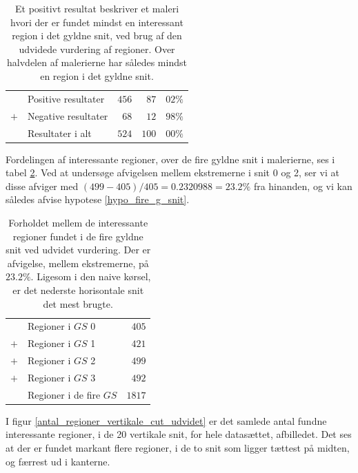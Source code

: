 {\begin{table}[H]
    \centering
    \begin{tabular}{r@{\ \ }p{12em}r|r@{.}l}
            & Positive resultater   & $456$ &  $87$ & $02\%$ \\
        $+$ & Negative resultater   &  $68$ &  $12$ & $98\%$ \\\hline
            & Resultater i alt      & $524$ & $100$ & $00\%$
    \end{tabular}
    \caption[]{Et positivt resultat beskriver et maleri hvori der er
    fundet mindst en interessant region i det gyldne snit, ved brug af
    den udvidede vurdering af regioner. Over halvdelen af malerierne har
    således mindst en region i det gyldne snit.}
    \label{ud_tabel_fordeling}
\end{table}

Fordelingen af interessante regioner, over de fire gyldne snit i
malerierne, ses i tabel \ref{ud_tabel_fire_snit}. Ved at undersøge
afvigelsen mellem ekstremerne i snit 0 og 2, ser vi at disse afviger med
$(499 - 405)/405 = 0.2320988 = 23.2 \%$ fra hinanden, og vi kan således
afvise hypotese \ref{hypo_fire_g_snit}.

\begin{table}[H]
    \centering
    \begin{tabular}{r@{\ \ }p{12em}r}
            & Regioner i $GS$ 0         &  $405$ \\
        $+$ & Regioner i $GS$ 1         &  $421$ \\
        $+$ & Regioner i $GS$ 2         &  $499$ \\
        $+$ & Regioner i $GS$ 3         &  $492$ \\\hline
            & Regioner i de fire $GS$   & $1817$
    \end{tabular}
    \caption[]{Forholdet mellem de interessante regioner fundet i de
    fire gyldne snit ved udvidet vurdering. Der er afvigelse, mellem
    ekstremerne, på $23.2 \%$. Ligesom i den naive kørsel, er det
    nederste horisontale snit det mest brugte.}
    \label{ud_tabel_fire_snit}
\end{table}

I figur \ref{antal_regioner_vertikale_cut_udvidet} er det samlede antal
fundne interessante regioner, i de 20 vertikale snit, for hele datasættet,
afbilledet. Det ses at der er fundet markant flere regioner, i de to snit som
ligger tættest på midten, og færrest ud i kanterne.

}
